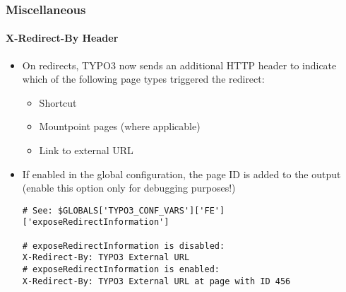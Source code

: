 %

\begin{frame}[fragile]
	\frametitle{Miscellaneous}
	\framesubtitle{X-Redirect-By Header}


	\begin{itemize}
		\item On redirects, TYPO3 now sends an additional HTTP header to indicate
			which of the following page types triggered the redirect:
			\begin{itemize}\small
				\item Shortcut
				\item Mountpoint pages (where applicable)
				\item Link to external URL
			\end{itemize}\normalsize
		\item If enabled in the global configuration, the page ID is added to the output\newline
			\smaller(enable this option only for debugging purposes!)\normalsize
\begin{lstlisting}
# See: $GLOBALS['TYPO3_CONF_VARS']['FE']['exposeRedirectInformation']

# exposeRedirectInformation is disabled:
X-Redirect-By: TYPO3 External URL
# exposeRedirectInformation is enabled:
X-Redirect-By: TYPO3 External URL at page with ID 456
\end{lstlisting}

	\end{itemize}

\end{frame}

